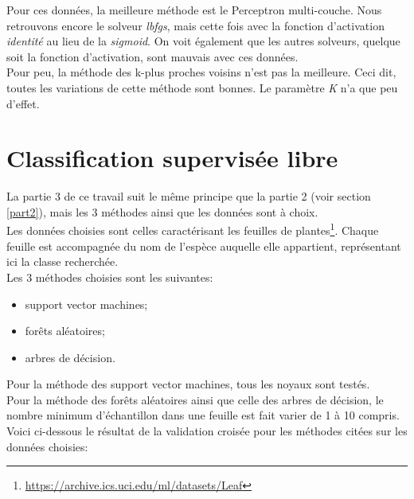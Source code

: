 \documentclass[11pt, a4paper]{article}
\begin{document}
Pour ces données, la meilleure méthode est le Perceptron multi-couche.
Nous retrouvons encore le solveur \textit{lbfgs},
mais cette fois avec la fonction d'activation \textit{identité} au lieu de la \textit{sigmoid}.
On voit également que les autres solveurs, quelque soit la fonction d'activation, sont mauvais avec ces données. \\

Pour peu, la méthode des k-plus proches voisins n'est pas la meilleure.
Ceci dit, toutes les variations de cette méthode sont bonnes.
Le paramètre \textit{K} n'a que peu d'effet.

\newpage

\section{Classification supervisée libre}

La partie 3 de ce travail suit le même principe que la partie 2 (voir section \ref{part2}),
mais les 3 méthodes ainsi que les données sont à choix. \\

Les données choisies sont celles caractérisant les feuilles de plantes\footnote{\url{https://archive.ics.uci.edu/ml/datasets/Leaf}}.
Chaque feuille est accompagnée du nom de l'espèce auquelle elle appartient, représentant ici la classe recherchée. \\

Les 3 méthodes choisies sont les suivantes:
\begin{itemize}
    \item support vector machines;
    \item forêts aléatoires;
    \item arbres de décision. \\
\end{itemize}

Pour la méthode des support vector machines, tous les noyaux sont testés. \\
Pour la méthode des forêts aléatoires ainsi que celle des arbres de décision,
le nombre minimum d'échantillon dans une feuille est fait varier de 1 à 10 compris. \\

Voici ci-dessous le résultat de la validation croisée pour les méthodes citées sur les données choisies:
\end{document}
